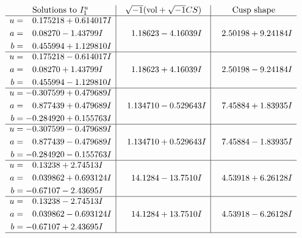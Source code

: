 \documentclass[1p]{elsarticle_modified}
\theoremstyle{definition}
\newcommand{\I}{\sqrt{-1}}
\begin{document}
$$\begin{array}{c|c|c}  
\text{Solutions to }I^u_{1}& \I (\text{vol} + \sqrt{-1}CS) & \text{Cusp shape}\\
 \hline 
\begin{aligned}
u &= \phantom{-}0.175218 + 0.614017 I \\
a &= \phantom{-}0.08270 - 1.43799 I \\
b &= \phantom{-}0.455994 + 1.129810 I\end{aligned}
 & \phantom{-}1.18623 - 4.16039 I & \phantom{-}2.50198 + 9.24184 I \\ \hline\begin{aligned}
u &= \phantom{-}0.175218 - 0.614017 I \\
a &= \phantom{-}0.08270 + 1.43799 I \\
b &= \phantom{-}0.455994 - 1.129810 I\end{aligned}
 & \phantom{-}1.18623 + 4.16039 I & \phantom{-}2.50198 - 9.24184 I \\ \hline\begin{aligned}
u &= -0.307599 + 0.479689 I \\
a &= \phantom{-}0.877439 + 0.479689 I \\
b &= -0.284920 + 0.155763 I\end{aligned}
 & \phantom{-}1.134710 - 0.529643 I & \phantom{-}7.45884 + 1.83935 I \\ \hline\begin{aligned}
u &= -0.307599 - 0.479689 I \\
a &= \phantom{-}0.877439 - 0.479689 I \\
b &= -0.284920 - 0.155763 I\end{aligned}
 & \phantom{-}1.134710 + 0.529643 I & \phantom{-}7.45884 - 1.83935 I \\ \hline\begin{aligned}
u &= \phantom{-}0.13238 + 2.74513 I \\
a &= \phantom{-}0.039862 + 0.693124 I \\
b &= -0.67107 - 2.43695 I\end{aligned}
 & \phantom{-}14.1284 - 13.7510 I & \phantom{-}4.53918 + 6.26128 I \\ \hline\begin{aligned}
u &= \phantom{-}0.13238 - 2.74513 I \\
a &= \phantom{-}0.039862 - 0.693124 I \\
b &= -0.67107 + 2.43695 I\end{aligned}
 & \phantom{-}14.1284 + 13.7510 I & \phantom{-}4.53918 - 6.26128 I\\
 \hline 
 \end{array}$$\newpage\newpage\renewcommand{\arraystretch}{1}
\end{document}
